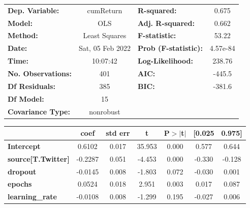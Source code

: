 \begin{center}
\begin{tabular}{lclc}
\toprule
\textbf{Dep. Variable:}              &    cumReturn     & \textbf{  R-squared:         } &     0.675   \\
\textbf{Model:}                      &       OLS        & \textbf{  Adj. R-squared:    } &     0.662   \\
\textbf{Method:}                     &  Least Squares   & \textbf{  F-statistic:       } &     53.22   \\
\textbf{Date:}                       & Sat, 05 Feb 2022 & \textbf{  Prob (F-statistic):} &  4.57e-84   \\
\textbf{Time:}                       &     10:07:42     & \textbf{  Log-Likelihood:    } &    238.76   \\
\textbf{No. Observations:}           &         401      & \textbf{  AIC:               } &    -445.5   \\
\textbf{Df Residuals:}               &         385      & \textbf{  BIC:               } &    -381.6   \\
\textbf{Df Model:}                   &          15      & \textbf{                     } &             \\
\textbf{Covariance Type:}            &    nonrobust     & \textbf{                     } &             \\
\bottomrule
\end{tabular}
\begin{tabular}{lcccccc}
                                     & \textbf{coef} & \textbf{std err} & \textbf{t} & \textbf{P$> |$t$|$} & \textbf{[0.025} & \textbf{0.975]}  \\
\midrule
\textbf{Intercept}                   &       0.6102  &        0.017     &    35.953  &         0.000        &        0.577    &        0.644     \\
\textbf{source[T.Twitter]}           &      -0.2287  &        0.051     &    -4.453  &         0.000        &       -0.330    &       -0.128     \\
\textbf{dropout}                     &      -0.0145  &        0.008     &    -1.803  &         0.072        &       -0.030    &        0.001     \\
\textbf{epochs}                      &       0.0524  &        0.018     &     2.951  &         0.003        &        0.017    &        0.087     \\
\textbf{learning\_rate}              &      -0.0108  &        0.008     &    -1.299  &         0.195        &       -0.027    &        0.006     \\

\end{tabular}
\end{center}
